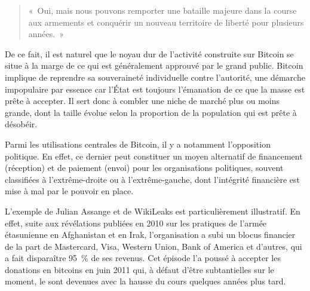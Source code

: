 \begin{quote}
«~Oui, mais nous pouvons remporter une bataille majeure dans la course aux armements et conquérir un nouveau territoire de liberté pour plusieurs années.~»
\end{quote}

De ce fait, il est naturel que le noyau dur de l'activité construite sur Bitcoin se situe à la marge de ce qui est généralement approuvé par le grand public. Bitcoin implique de reprendre sa souveraineté individuelle contre l'autorité, une démarche impopulaire par essence car l'État est toujours l'émanation de ce que la masse est prête à accepter. Il sert donc à combler une niche de marché plus ou moins grande, dont la taille évolue selon la proportion de la population qui est prête à désobéir.


Parmi les utilisations centrales de Bitcoin, il y a notamment l'opposition politique. En effet, ce dernier peut constituer un moyen alternatif de financement (réception) et de paiement (envoi) pour les organisations politiques, souvent classifiées à l'extrême-droite ou à l'extrême-gauche, dont l'intégrité financière est mise à mal par le pouvoir en place.

L'exemple de Julian Assange et de WikiLeaks est particulièrement illustratif. En effet, suite aux révélations publiées en 2010 sur les pratiques de l'armée étasunienne en Afghanistan et en Irak, l'organisation a subi un blocus financier de la part de Mastercard, Visa, Western Union, Bank of America et d'autres, qui a fait disparaître 95~\% de ses revenus. Cet épisode l'a poussé à accepter les donations en bitcoins en juin 2011 qui, à défaut d'être subtantielles sur le moment, le sont devenues avec la hausse du cours quelques années plus tard.

